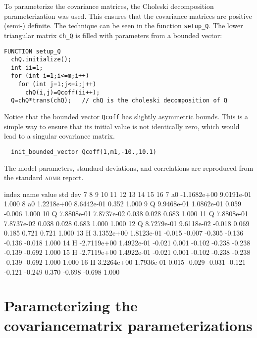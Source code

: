 To parameterize the covariance matrices, the Choleski decomposition
parameterization was used. This ensures that the covariance matrices are
positive (semi-) definite. The technique can be seen in the function
\texttt{setup\_Q}. 
The lower triangular matrix \texttt{ch\_Q} is filled with parameters
from a bounded vector:
\begin{lstlisting}
FUNCTION setup_Q
  chQ.initialize();
  int ii=1;
  for (int i=1;i<=m;i++)
    for (int j=1;j<=i;j++)
      chQ(i,j)=Qcoff(ii++);
  Q=chQ*trans(chQ);   // chQ is the choleski decomposition of Q 
\end{lstlisting}
Notice that the bounded vector \texttt{Qcoff} has slightly asymmetric
bounds. This is a simple way to ensure that its initial value is not
identically zero, which would lead to a singular covariance matrix.
\begin{lstlisting}
  init_bounded_vector Qcoff(1,m1,-10.,10.1)
\end{lstlisting}

The model parameters, standard deviations, and 
correlations are reproduced from the
standard \textsc{admb} report.

\begin{smallcode}
 index   name    value      std dev    7      8      9     10     11     12     13     14     15      16   
    7   a0    -1.1682e+00 9.0191e-01  1.000
    8   a0     1.2218e+00 8.6442e-01  0.352  1.000
    9   Q      9.9468e-01 1.0862e-01  0.059 -0.006  1.000
   10   Q      7.8808e-01 7.8737e-02  0.038  0.028  0.683  1.000
   11   Q      7.8808e-01 7.8737e-02  0.038  0.028  0.683  1.000  1.000
   12   Q      8.7279e-01 9.6118e-02 -0.018  0.069  0.185  0.721  0.721  1.000
   13   H      3.1352e+00 1.8123e-01 -0.015 -0.007 -0.305 -0.136 -0.136 -0.018  1.000
   14   H     -2.7119e+00 1.4922e-01 -0.021  0.001 -0.102 -0.238 -0.238 -0.139 -0.692  1.000
   15   H     -2.7119e+00 1.4922e-01 -0.021  0.001 -0.102 -0.238 -0.238 -0.139 -0.692  1.000  1.000
   16   H      3.2264e+00 1.7936e-01  0.015 -0.029 -0.031 -0.121 -0.121 -0.249  0.370 -0.698 -0.698  1.000
\end{smallcode}


\section{Parameterizing the covariance\br matrix parameterizations}

